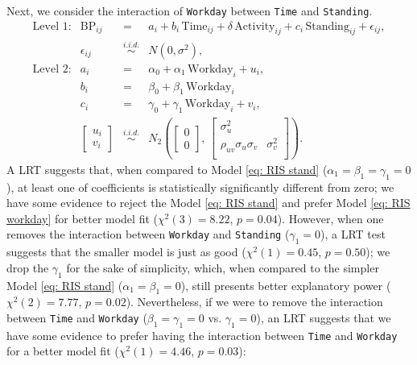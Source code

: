 \documentclass[12pt,twoside,letterpaper]{article}
\theoremstyle{definition}
\theoremstyle{definition}
\begin{document}
Next, we consider the interaction of \texttt{Workday} between \texttt{Time} and \texttt{Standing}. 
\begin{equation}\label{eq: RIS workday}
    \begin{array}{rrcll}
        \text{Level 1}: & \text{BP}_{ij} &=& a_i + b_i\, \text{Time}_{ij} + \delta \, \text{Activity}_{ij} + c_i\, \text{Standing}_{ij} + \epsilon_{ij}, \\[0.5ex]
         & \epsilon_{ij} &\overset{i.i.d.}{\sim}& N(0, \sigma^2), \\[0.5ex]
        \text{Level 2}: & a_i &=& \alpha_0 + \alpha_1\, \text{Workday}_i + u_i, \\[0.5ex]
        & b_i &=& \beta_0 + \beta_1\, \text{Workday}_i \\[0.5ex]
        & c_i &=& \gamma_0 + \gamma_1\, \text{Workday}_i + v_i, \\[1ex]
         & \begin{bmatrix} u_i \\ v_i 
         \end{bmatrix} &\overset{i.i.d.}{\sim}& N_2\left(\begin{bmatrix} 0 \\ 0 \end{bmatrix},\, \begin{bmatrix} \sigma_u^2 &\\ 
         \rho_{uv}\sigma_u\sigma_v & \sigma_v^2\\
         \end{bmatrix} \right).
    \end{array}
\end{equation}
A LRT suggests that, when compared to Model \ref{eq: RIS stand} ($\alpha_1 = \beta_1 = \gamma_1 = 0$), at least one of coefficients is statistically significantly different from zero; we have some evidence to reject the Model \ref{eq: RIS stand} and prefer Model \ref{eq: RIS workday} for better model fit ($\chi^2 (3) = 8.22$, $p = 0.04$). However, when one removes the interaction between \texttt{Workday} and \texttt{Standing} ($\gamma_1 = 0$), a LRT test suggests that the smaller model is just as good ($\chi^2 (1) = 0.45$, $p = 0.50$); we drop the $\gamma_1$ for the sake of simplicity, which, when compared to the simpler Model \ref{eq: RIS stand} ($\alpha_1 = \beta_1 = 0$), still presents better explanatory power ($\chi^2 (2) = 7.77$, $p = 0.02$). Nevertheless, if we were to remove the interaction between \texttt{Time} and \texttt{Workday} ($\beta_1 = \gamma_1 = 0$ vs. $\gamma_1 = 0$), an LRT suggests that we have some evidence to prefer having the interaction between \texttt{Time} and \texttt{Workday} for a better model fit ($\chi^2 (1) = 4.46$, $p = 0.03$):
\end{document}
